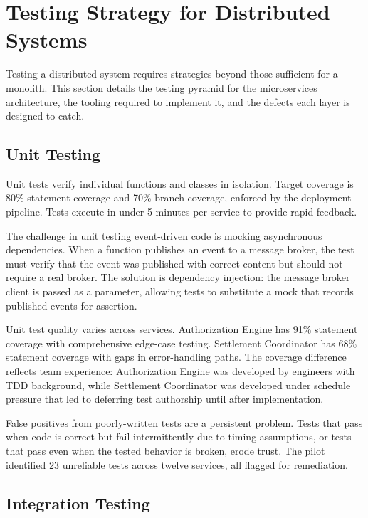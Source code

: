 \section{Testing Strategy for Distributed Systems}

Testing a distributed system requires strategies beyond those sufficient for a monolith. This section details the testing pyramid for the microservices architecture, the tooling required to implement it, and the defects each layer is designed to catch.

\subsection{Unit Testing}

Unit tests verify individual functions and classes in isolation. Target coverage is 80\% statement coverage and 70\% branch coverage, enforced by the deployment pipeline. Tests execute in under 5 minutes per service to provide rapid feedback.

The challenge in unit testing event-driven code is mocking asynchronous dependencies. When a function publishes an event to a message broker, the test must verify that the event was published with correct content but should not require a real broker. The solution is dependency injection: the message broker client is passed as a parameter, allowing tests to substitute a mock that records published events for assertion.

Unit test quality varies across services. Authorization Engine has 91\% statement coverage with comprehensive edge-case testing. Settlement Coordinator has 68\% statement coverage with gaps in error-handling paths. The coverage difference reflects team experience: Authorization Engine was developed by engineers with TDD background, while Settlement Coordinator was developed under schedule pressure that led to deferring test authorship until after implementation.

False positives from poorly-written tests are a persistent problem. Tests that pass when code is correct but fail intermittently due to timing assumptions, or tests that pass even when the tested behavior is broken, erode trust. The pilot identified 23 unreliable tests across twelve services, all flagged for remediation.

\subsection{Integration Testing}

